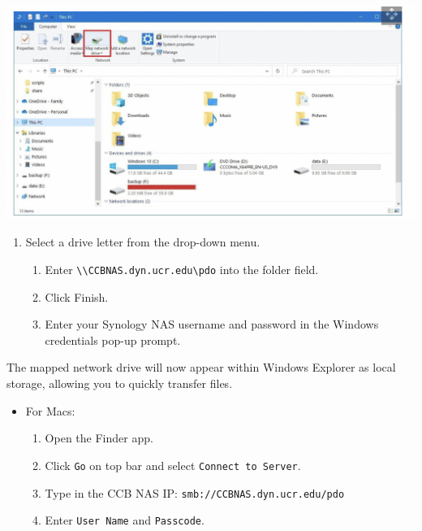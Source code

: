 \documentclass[
]{book}
\providecommand{\tightlist}{%
  \setlength{\itemsep}{0pt}\setlength{\parskip}{0pt}}
\begin{document}
\begin{flushleft}\includegraphics[width=0.8\linewidth]{images/nas_map10} \end{flushleft}

\begin{enumerate}
\def\labelenumi{\arabic{enumi}.}
\setcounter{enumi}{3}
\tightlist
\item
  Select a drive letter from the drop-down menu.

  \begin{enumerate}
  \def\labelenumii{\arabic{enumii}.}
  \setcounter{enumii}{4}
  \tightlist
  \item
    Enter \texttt{\textbackslash{}\textbackslash{}CCBNAS.dyn.ucr.edu\textbackslash{}pdo} into the folder field.
  \item
    Click Finish.
  \item
    Enter your Synology NAS username and password in the Windows credentials pop-up prompt.
  \end{enumerate}
\end{enumerate}

The mapped network drive will now appear within Windows Explorer as local storage, allowing you to quickly transfer files.

\begin{itemize}
\tightlist
\item
  For Macs:

  \begin{enumerate}
  \def\labelenumi{\arabic{enumi}.}
  \tightlist
  \item
    Open the Finder app.
  \item
    Click \texttt{Go} on top bar and select \texttt{Connect\ to\ Server}.
  \item
    Type in the CCB NAS IP: \texttt{smb://CCBNAS.dyn.ucr.edu/pdo}
  \item
    Enter \texttt{User\ Name} and \texttt{Passcode}.
  \end{enumerate}
\end{itemize}
\end{document}
